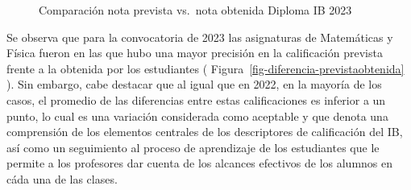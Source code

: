 \documentclass[
  letterpaper,
  DIV=11,
  numbers=noendperiod]{scrartcl}
\begin{document}
\begin{figure}
\begin{minipage}[t]{0.50\linewidth}
{\centering 


}

\end{minipage}%
\newline
\begin{minipage}[t]{0.50\linewidth}

{\centering 


}

\end{minipage}%
%
\begin{minipage}[t]{0.50\linewidth}

{\centering 


}

\end{minipage}%

\caption{\label{fig-prevista-obtenida}Comparación nota prevista vs.~nota
obtenida Diploma IB 2023}

\end{figure}

Se observa que para la convocatoria de 2023 las asignaturas de
Matemáticas y Física fueron en las que hubo una mayor precisión en la
calificación prevista frente a la obtenida por los estudiantes (
Figura~\ref{fig-diferencia-previstaobtenida} ). Sin embargo, cabe
destacar que al igual que en 2022, en la mayoría de los casos, el
promedio de las diferencias entre estas calificaciones es inferior a un
punto, lo cual es una variación considerada como aceptable y que denota
una comprensión de los elementos centrales de los descriptores de
calificación del IB, así como un seguimiento al proceso de aprendizaje
de los estudiantes que le permite a los profesores dar cuenta de los
alcances efectivos de los alumnos en cáda una de las clases.
\end{document}
